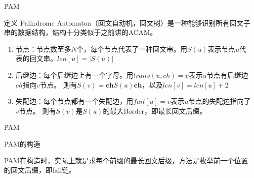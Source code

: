 \documentclass{ctexbeamer}		%
\begin{document}
\begin{frame}{PAM}

\begin{block}{定义}
Palindrome Automaton（回文自动机，回文树）是一种能够识别所有回文子串的数据结构，结构十分类似于之前讲的ACAM。


\pause

\begin{enumerate}
    \item 节点：节点数至多$N$个，每个节点代表了一种回文串。用$S(u)$表示节点$u$代表的回文串。$len[u] = |S(u)|$

    \pause

    \item 后继边：每个后继边上有一个字母。用$trans(u,ch) = v$表示$u$节点有后继边$ch$指向$v$节点。 则有$S(v) = \textbf{ch} S(u) \textbf{ch}$，以及$len[v] = len[u] + 2$
    
    \pause
    
    \item 失配边：每个节点都有一个失配边，用$fail[u] = v$表示$u$节点的失配边指向了$v$节点。 则有$S(v)$是$S(u)$的最大Border，即最长回文后缀。

\end{enumerate}
\end{block}
\end{frame}

\begin{frame}{PAM}

\begin{block}{PAM的构造}

PAM在构造时，实际上就是求每个前缀的最长回文后缀，方法是枚举前一个位置的回文后缀，即fail链。
\begin{figure}
    \centering
\end{figure}
    
\end{block}    
\end{frame}
\end{document}
